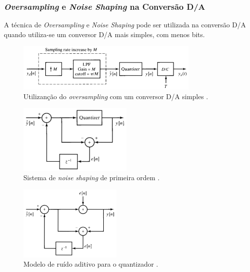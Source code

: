 \begin{frame}[allowframebreaks]
  \frametitle{\textit{Oversampling} e \textit{Noise Shaping} na Conversão D/A}

  A técnica de \textit{Oversampling} e \textit{Noise Shaping} pode ser utilizada na
  conversão D/A quando utiliza-se um conversor D/A mais simples, com menos bits.

  \begin{figure}[h!]
  \centering
  \includegraphics[width=0.8\textwidth]{images/oppenheim_fig467.png}
  \caption{Utilizanção do \textit{oversampling} com um conversor D/A simples \citep{oppenheim2009}.}
  \label{fig:oppenheim_fig467}
  \end{figure}

  \framebreak

  \begin{figure}[h!]
  \centering
  \includegraphics[width=0.5\textwidth]{images/oppenheim_fig468.png}
  \caption{Sistema de \textit{noise shaping} de primeira ordem \citep{oppenheim2009}.}
  \label{fig:oppenheim_fig468}
  \end{figure}

  \framebreak

  \begin{figure}[h!]
  \centering
  \includegraphics[width=0.45\textwidth]{images/oppenheim_fig469.png}
  \caption{Modelo de ruído aditivo para o quantizador \citep{oppenheim2009}.}
  \label{fig:oppenheim_fig469}
  \end{figure}


\end{frame}
